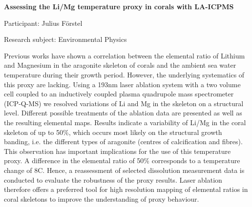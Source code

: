 \begin{minipage}[t]{1.0\textwidth}

\begin{center}

{{\large\bfseries Assessing the Li/Mg temperature proxy in corals with LA-ICPMS}\par}

\end{center}

{\noindent Participant: Julius Förstel\par} 

{\noindent Research subject: Environmental Physics\par}\medskip

\noindent Previous works have shown a correlation between the elemental ratio of Lithium and Magnesium in the aragonite skeleton of corals and the ambient sea water temperature during their growth period. However, the underlying systematics of this proxy are lacking.
Using a 193nm laser ablation system with a two volume cell coupled to an inductively coupled plasma quadrupole mass spectrometer (ICP-Q-MS) we resolved variations of Li and Mg in the skeleton on a structural level. Different possible treatments of the ablation data are presented as well as the resulting elemental maps. Results indicate a variability of Li/Mg in the coral skeleton of up to 50\%, which occurs most likely on the structural growth banding, i.e. the different types of aragonite (centres of calcification and fibres). This observation has important implications
for the use of this temperature proxy. A difference in the elemental ratio of 50\% corresponds to a temperature change of 8C. Hence, a reassessment of selected dissolution measurement data is conducted to evaluate the robustness of the proxy results.
Laser ablation therefore offers a preferred tool for high resolution mapping of elemental ratios in coral skeletons to improve the understanding of proxy behaviour.\par\end{minipage}

\hfill 

